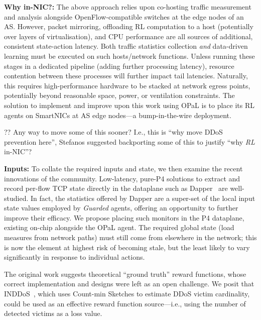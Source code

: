 \documentclass[sigconf,natbib=false]{acmart}
\newcommand{\fakepara}[1]{\noindent\textbf{#1:}}
\newcommand{\approachshort}{OPaL}
\begin{document}
\fakepara{Why in-NIC?}
The above approach relies upon co-hosting traffic measurement and analysis alongside OpenFlow-compatible switches at the edge nodes of an AS.
However, packet mirroring, offloading RL computation to a host (potentially over layers of virtualisation), and CPU performance are all sources of additional, consistent state-action latency.
Both traffic statistics collection \emph{and} data-driven learning must be executed on such hosts/network functions.
Unless running these stages in a dedicated pipeline (adding further processing latency), resource contention between these processes will further impact tail latencies.
Naturally, this requires high-performance hardware to be stacked at network egress points, potentially beyond reasonable space, power, or ventilation constraints.
The solution to implement and improve upon this work using \approachshort{} is to place its RL agents on SmartNICs at AS edge nodes---a bump-in-the-wire deployment.

?? Any way to move some of this sooner? I.e., this is ``why move DDoS prevention here'', Stefanos suggested backporting some of this to justify ``why \emph{RL} in-NIC''?

\fakepara{Inputs}
To collate the required inputs and state, we then examine the recent innovations of the community.
Low-latency, pure-P4 solutions to extract and record per-flow TCP state directly in the dataplane such as Dapper~\parencite{DBLP:conf/sosr/GhasemiBR17} are well-studied.
In fact, the statistics offered by Dapper are a super-set of the local input state values employed by \emph{Guarded} agents, offering an opportunity to further improve their efficacy. 
We propose placing such monitors in the P4 dataplane, existing on-chip alongside the \approachshort{} agent.
The required global state (load measures from network paths) must still come from elsewhere in the network; this is now the element at highest risk of becoming stale, but the least likely to vary significantly in response to individual actions.

The original work suggests theoretical ``ground truth'' reward functions, whose correct implementation and designs were left as an open challenge. 
We posit that INDDoS~\parencite{tnms-ddos-victim-ident}, which uses Count-min Sketches to estimate DDoS victim cardinality, could be used as an effective reward function source---i.e., using the number of detected victims as a loss value.
\end{document}
